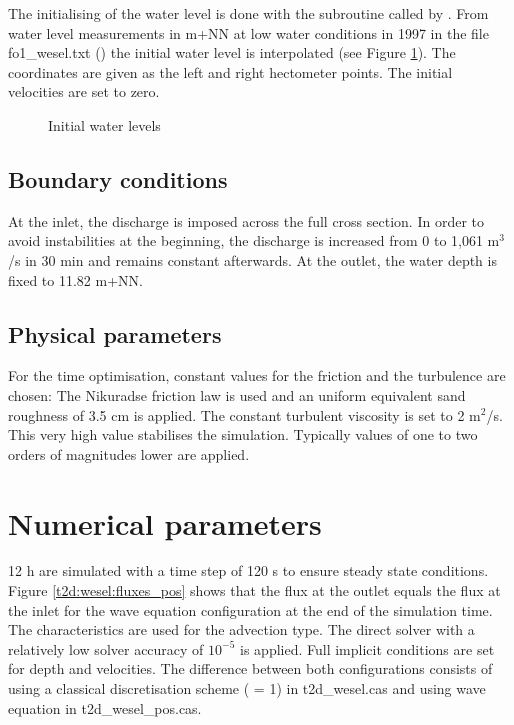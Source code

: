 The initialising of the water level is done with the subroutine
 called by .
From water level measurements in m+NN at low water conditions in 1997 in the
file fo1\_wesel.txt () the initial water level is
interpolated (see Figure \ref{t2d:wesel:free_surface0}).
The coordinates are given as the left and right hectometer points.
The initial velocities are set to zero.

\begin{figure} [h!]
\centering
{}
\caption{Initial water levels}
\label{t2d:wesel:free_surface0}
\end{figure}

\subsection{Boundary conditions}

At the inlet, the discharge is imposed across the full cross section.
In order to avoid instabilities at the beginning, the discharge is increased from
0 to 1,061 m$^3$/s in 30 min and remains constant afterwards.
At the outlet, the water depth is fixed to 11.82 m+NN.


\subsection{Physical parameters}
For the time optimisation, constant values for the friction and the turbulence
are chosen:
The Nikuradse friction law is used and an uniform equivalent sand roughness of
3.5 cm is applied.
The constant turbulent viscosity is set to 2 m$^2$/s.
This very high value stabilises the simulation.
Typically values of one to two orders of magnitudes lower are applied.

\section{Numerical parameters}
12 h are simulated with a time step of 120 s to ensure steady state conditions.
Figure \ref{t2d:wesel:fluxes_pos} shows that the flux at the outlet equals the
flux at the inlet for the wave equation configuration at the end of the simulation time.
The characteristics are used for the advection type.
The direct solver with a relatively low solver accuracy of $10^{-5}$ is applied.
Full implicit conditions are set for depth and velocities. 
The difference between both configurations consists of using a classical
discretisation scheme ( = 1)
in t2d\_wesel.cas and using wave equation in t2d\_wesel\_pos.cas.


